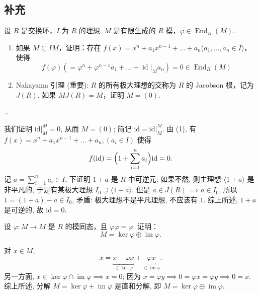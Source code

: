 \subsection{补充}

\setcounter{pb}{3}
\begin{problem}
    设 $ R $ 是交换环，$ I $ 为 $ R $ 的理想. $ M $ 是有限生成的 $ R $ 模，$ \varphi \in \operatorname{End}_R(M) $. 
    \begin{enumerate}[label=(\arabic*)]
        \item 如果 $ M \subseteq IM $，证明：存在 $ f(x) = x^n + a_1 x^{n-1} + \dots + a_n $($ a_1, \dots, a_n \in I $)，使得
              \[
                  f(\varphi) (= \varphi^n + \varphi^{n-1} a_1 + \dots + \operatorname{id} |_M a_n) = 0 \in \operatorname{End}_R(M)
              \]
        \item Nakayama 引理 (重要): $ R $ 的所有极大理想的交称为 $ R $ 的 Jacobson 根，记为 $ J(R) $. 如果 $ M J(R) = M $，证明 $ M = (0) $. 
    \end{enumerate}
\end{problem}

\begin{vain}
    \dots
    \par 我们证明 $\left.{\mathrm{id}}\right|_{M}^{M}=0$, 从而 $M=(0)$; 简记 $\mathrm{id}=\left.{\mathrm{id}}\right|_{M}^{M}$. 由 (1), 有 $f(x) = x^n + a_1 x^{n-1} + \dots + a_n,(a_{i}\in I)$ 使得  
        \[
            f(\mathrm{id})=\Bigl(1+\sum_{i=1}^{n}a_{i}\Bigr)\mathrm{id}=0.
        \]
    记 $a=\sum_{i=1}^{n}a_{i}\in I$, 下证明 $1+a$ 是 $R$ 中可逆元: 如果不然, 则主理想 $ \langle 1+a \rangle  $ 是非平凡的, 
    于是有某极大理想 $I_{0}\supseteq \langle 1+a \rangle$, 但是 $a\in J(R)\implies a\in I_{0}$, 所以 $1=(1+a)-a\in I_{0}$, 
    矛盾: 极大理想不是平凡理想, 不应该有 $1$. 综上所述, $1+a$ 是可逆的, 故 $\mathrm{id}=0$.
\end{vain}

\setcounter{pb}{6}
\begin{problem}
    设 $ \varphi: M \to M $ 是 $ R $ 的模同态，且 $ \varphi \varphi = \varphi $. 
    证明：
    \[
        M = \ker \varphi \oplus \operatorname{im} \varphi.
    \]
\end{problem}

\begin{solution}
    对 $x\in M$, 
        \[
            x=\underbracket{x-\varphi x}_{\in\ker \varphi}+\underbracket{\varphi x}_{\in \operatorname{im}\varphi}.
        \]
    另一方面, $x\in\ker\varphi\cap \operatorname{im}\varphi\implies x=0$; 因为 $x=\varphi y\implies 0=\varphi x=\varphi y\implies 0=x$. 
    综上所述, 分解 $M=\ker\varphi+\operatorname{im}\varphi$ 是直和分解, 即 $M=\ker\varphi\oplus\operatorname{im}\varphi$. 
\end{solution}
    
